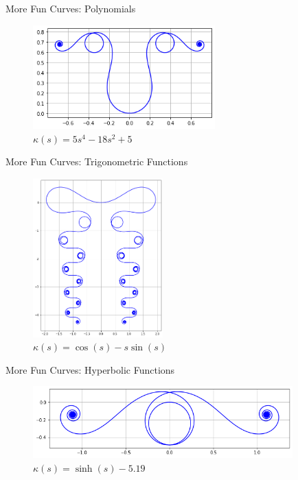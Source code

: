 \documentclass{beamer}
\begin{document}
\begin{frame}{More Fun Curves: Polynomials}
	\begin{figure}
		\caption{$\kappa(s) = 5 s ^ 4 - 18 s ^ 2 + 5$}
		\centering
		\includegraphics[width=70mm, scale=0.5]{five_s^4.png}
	\end{figure}
\end{frame}

\begin{frame}{More Fun Curves: Trigonometric Functions}
	\begin{figure}
		\caption{$\kappa(s) = \cos(s) - s \sin(s)$}
		\centering
		\includegraphics[width=50mm, scale=0.2]{elegant_madness.png}
	\end{figure}
\end{frame}
	
\begin{frame}{More Fun Curves: Hyperbolic Functions}
	\begin{figure}
		\caption{$\kappa(s) = \sinh(s) - 5.19$}
		\centering
		\includegraphics[width=100mm, scale=0.5]{sinh.png}
	\end{figure}
\end{frame}
\end{document}
